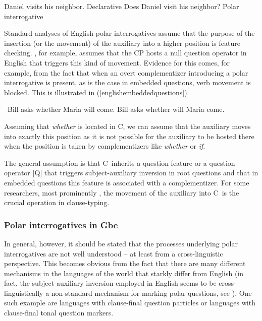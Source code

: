 \begin{exe}
\ex\label{simpleenglishpolarinterrtwo}\begin{xlist}
\ex Daniel visits his neighbor. \hfill Declarative\label{simpleenglishpolarinterra}
\ex Does Daniel visit his neighbor? \hfill Polar interrogative\label{simpleenglishpolarinterrb}
\end{xlist}
\end{exe}

\noindent Standard analyses of English polar interrogatives assume that the purpose of the insertion (or the movement) of the auxiliary into a higher position is feature checking. \citet{roberts1993}, for example, assumes that the CP hosts a null question operator in English that triggers this kind of movement. Evidence for this comes, for example, from the fact that when an overt complementizer introducing a polar interrogative is present, as is the case in embedded questions, verb movement is blocked. This is illustrated in (\ref{englishembeddedquestions}).%

\begin{exe}
\ex\label{englishembeddedquestions}\begin{xlist}
\ex \textcolor{white}{*}Bill asks whether Maria will come. \label{englishembeddedquestionsa}
\ex *Bill asks whether will Maria come.  \label{englishembeddedquestionsb}
\end{xlist}
\end{exe}

\noindent Assuming that \textit{whether} is located in C\textdegree , we can assume that the auxiliary moves into exactly this position as it is not possible for the auxiliary to be hosted there when the position is taken by complementizers like \textit{whether} or \textit{if}.

The general assumption is that C\textdegree\ inherits a question feature or a question operator $[$Q$]$ that triggers subject-auxiliary inversion in root questions and that in embedded questions this feature is associated with a complementizer. For some researchers, most prominently \citet{cheng1997typology}, the movement of the auxiliary into C\textdegree\ is the crucial operation in clause-typing.

\subsubsection{Polar interrogatives in Gbe}
In general, however, it should be stated that the processes underlying polar interrogatives are not well understood -- at least from a cross-linguistic perspective. This becomes obvious from the fact that there are many different mechanisms in the languages of the world that starkly differ from English (in fact, the subject-auxiliary inversion employed in English seems to be cross-linguistically a non-standard mechanism for marking polar questions, see \citealt{ultan1978some}). One such example are languages with clause-final question particles or languages with clause-final tonal question markers.

